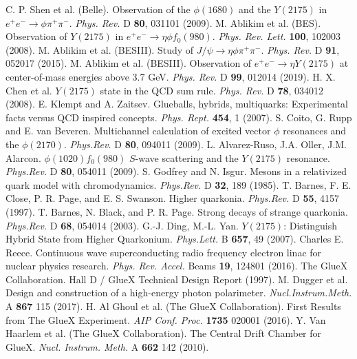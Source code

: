 \begin{thebibliography}{ABC}
     C. P. Shen et al. (Belle). Observation of the $\phi(1680)$ and the $Y(2175)$ in $e^{+}e^{-} \rightarrow \phi \pi^{+} \pi^{-}$. \emph{Phys. Rev.} D \textbf{80}, 031101 (2009).
     M. Ablikim et al. (BES). Observation of $Y(2175)$ in $e^{+}e^{-} \rightarrow \eta \phi f_{0}(980)$. \emph{Phys. Rev. Lett.} \textbf{100}, 102003 (2008).
     M. Ablikim et al. (BESIII). Study of $J/\psi \rightarrow \eta \phi \pi^{+} \pi^{-}$. \emph{Phys. Rev.} D \textbf{91}, 052017 (2015).
     M. Ablikim et al. (BESIII). Observation of $e^{+}e^{-} \rightarrow \eta Y(2175)$ at center-of-mass energies above 3.7 GeV. \emph{Phys. Rev.} D \textbf{99}, 012014 (2019).
     H. X. Chen et al. $Y(2175)$ state in the QCD sum rule. \emph{Phys. Rev.} D \textbf{78}, 034012 (2008).
     E. Klempt and A. Zaitsev. Glueballs, hybrids, multiquarks: Experimental facts versus QCD inspired concepts. \emph{Phys. Rept.} \textbf{454}, 1 (2007).
     S. Coito, G. Rupp and E. van Beveren. Multichannel calculation of excited vector $\phi$ resonances and the $\phi(2170)$. \emph{Phys.Rev.} D \textbf{80}, 094011 (2009).
     L. Alvarez-Ruso, J.A. Oller, J.M. Alarcon. $\phi(1020)f_{0}(980)$ $S$-wave scattering and the $Y(2175)$ resonance. \emph{Phys.Rev.} D \textbf{80}, 054011 (2009).
     S. Godfrey and N. Isgur. Mesons in a relativized quark model with chromodynamics. \emph{Phys.Rev.} D \textbf{32}, 189 (1985).
     T. Barnes, F. E. Close, P. R. Page, and E. S. Swanson. Higher quarkonia. \emph{Phys.Rev.} D \textbf{55}, 4157 (1997).
     T. Barnes, N. Black, and P. R. Page. Strong decays of strange quarkonia. \emph{Phys.Rev.} D \textbf{68}, 054014 (2003).
     G.-J. Ding, M.-L. Yan. $Y(2175)$: Distinguish Hybrid State from Higher Quarkonium. \emph{Phys.Lett.} B \textbf{657}, 49 (2007).
     Charles E. Reece. Continuous wave superconducting radio frequency electron linac for nuclear physics research. \emph{Phys. Rev. Accel.} Beams \textbf{19}, 124801 (2016).
     The GlueX Collaboration. Hall D / GlueX Technical Design Report (1997).
     M. Dugger et al. Design and construction of a high-energy photon polarimeter. \emph{Nucl.Instrum.Meth.} A \textbf{867} 115 (2017).
     H. Al Ghoul et al. (The GlueX Collaboration). First Results from The GlueX Experiment. \emph{AIP Conf. Proc.} \textbf{1735} 020001 (2016).
     Y. Van Haarlem et al. (The GlueX Collaboration). The Central Drift Chamber for GlueX. \emph{Nucl. Instrum. Meth.} A \textbf{662} 142 (2010).

\end{thebibliography}
